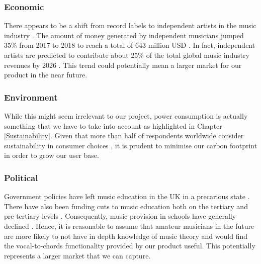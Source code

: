 \subsubsection{Economic}
There appears to be a shift from record labels to independent artists in the music industry \cite{worldwide2020}. The amount of money generated by independent musicians jumped 35\% from 2017 to 2018 to reach a total of 643 million USD \cite{independentartists}. In fact, independent artists are predicted to contribute about 25\% of the total global music industry revenues by 2026 \cite{rollingstone}. This trend could potentially mean a larger market for our product in the near future.

\subsubsection{Environment}
While this might seem irrelevant to our project, power consumption is actually something that we have to take into account as highlighted in Chapter \ref{Sustainability}. Given that more than half of respondents worldwide consider sustainability in consumer choices \cite{GlobalSurvey}, it is prudent to minimise our carbon footprint in order to grow our user base.

\subsubsection{Political}
Government policies have left music education in the UK in a precarious state \cite{perilousstate}. There have also been funding cuts to music education both on the tertiary and pre-tertiary levels \cite{weale2021} \cite{macdonald2021}. Consequently, music provision in schools have generally declined \cite{brown2018} \cite{weale2018}. Hence, it is reasonable to assume that amateur musicians in the future are more likely to not have in depth knowledge of music theory and would find the vocal-to-chords functionality provided by our product useful. This potentially represents a larger market that we can capture.


